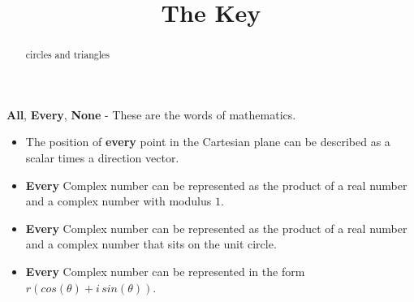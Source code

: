 \documentclass{ximera}
\title{The Key}
\begin{document}
\begin{abstract}
circles and triangles
\end{abstract}
\maketitle





\textbf{\textcolor{red!80!black}{All}}, \textbf{\textcolor{red!80!black}{Every}}, \textbf{\textcolor{red!80!black}{None}} - These are the words of mathematics. 



\begin{itemize}
\item The position of \textbf{\textcolor{red!80!black}{every}} point in the Cartesian plane can be described as a scalar times a direction vector.  

\item \textbf{\textcolor{red!80!black}{Every}} Complex number can be represented as the product of a real number and a complex number with modulus $1$.

\item \textbf{\textcolor{red!80!black}{Every}} Complex number can be represented as the product of a real number and a complex number that sits on the unit circle.

\item \textbf{\textcolor{red!80!black}{Every}} Complex number can be represented in the form $r (cos(\theta) + i \, sin(\theta))$.
\end{itemize}
\end{document}
